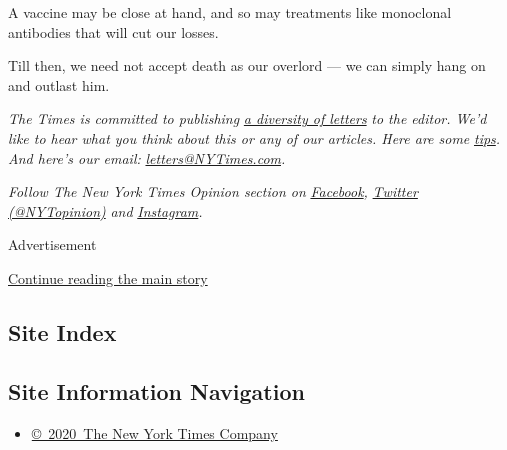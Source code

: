 A vaccine may be close at hand, and so may treatments like monoclonal
antibodies that will cut our losses.

Till then, we need not accept death as our overlord --- we can simply
hang on and outlast him.

\emph{The Times is committed to publishing}
\href{https://www.nytimes3xbfgragh.onion/2019/01/31/opinion/letters/letters-to-editor-new-york-times-women.html}{\emph{a
diversity of letters}} \emph{to the editor. We'd like to hear what you
think about this or any of our articles. Here are some}
\href{https://help.nytimes3xbfgragh.onion/hc/en-us/articles/115014925288-How-to-submit-a-letter-to-the-editor}{\emph{tips}}\emph{.
And here's our email:}
\href{mailto:letters@NYTimes.com}{\emph{letters@NYTimes.com}}\emph{.}

\emph{Follow The New York Times Opinion section on}
\href{https://www.facebookcorewwwi.onion/nytopinion}{\emph{Facebook}}\emph{,}
\href{http://twitter.com/NYTOpinion}{\emph{Twitter (@NYTopinion)}}
\emph{and}
\href{https://www.instagram.com/nytopinion/}{\emph{Instagram}}\emph{.}

Advertisement

\protect\hyperlink{after-bottom}{Continue reading the main story}

\hypertarget{site-index}{%
\subsection{Site Index}\label{site-index}}

\hypertarget{site-information-navigation}{%
\subsection{Site Information
Navigation}\label{site-information-navigation}}

\begin{itemize}
\tightlist
\item
  \href{https://help.nytimes3xbfgragh.onion/hc/en-us/articles/115014792127-Copyright-notice}{©~2020~The
  New York Times Company}
\end{itemize}

